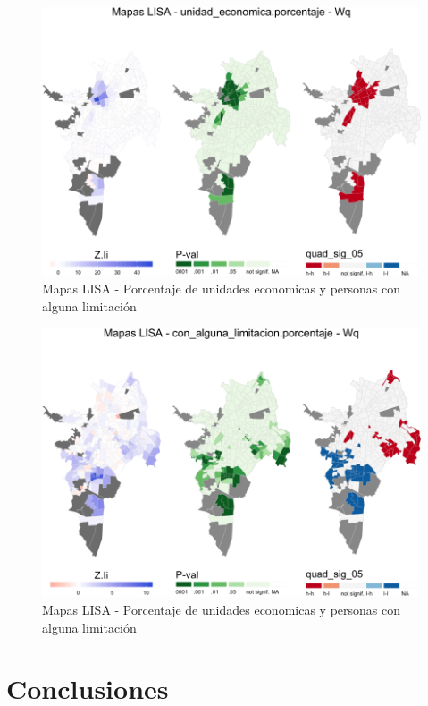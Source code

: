 \documentclass[12pt,]{book}
\begin{document}
\begin{figure}
\includegraphics[width=1\linewidth]{tesis-unigis_files/figure-latex/lisa-areaep-ue-cal-1} \caption{Mapas LISA - Porcentaje de unidades economicas y personas con alguna limitación }\label{fig:lisa-areaep-ue-cal1}
\end{figure}\begin{figure}
\includegraphics[width=1\linewidth]{tesis-unigis_files/figure-latex/lisa-areaep-ue-cal-2} \caption{Mapas LISA - Porcentaje de unidades economicas y personas con alguna limitación }\label{fig:lisa-areaep-ue-cal2}
\end{figure}

\chapter{Conclusiones}\label{conclusiones}
\end{document}
